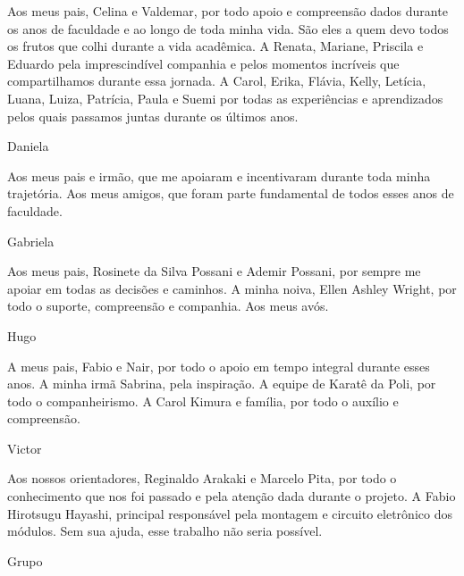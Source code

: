 Aos meus pais, Celina e Valdemar, por todo apoio e compreensão dados durante os anos de faculdade e ao longo de toda minha vida. São eles a quem devo todos os frutos que colhi durante a vida acadêmica.
A Renata, Mariane, Priscila e Eduardo pela imprescindível companhia e pelos momentos incríveis que compartilhamos durante essa jornada.
A Carol, Erika, Flávia, Kelly, Letícia, Luana, Luiza, Patrícia, Paula e Suemi por todas as experiências e aprendizados pelos quais passamos juntas durante os últimos anos.
\begin{flushright}
    Daniela
\end{flushright}

Aos meus pais e irmão, que me apoiaram e incentivaram durante toda minha trajetória. Aos meus amigos, que foram parte fundamental de todos esses anos de faculdade.
\begin{flushright}
    Gabriela
\end{flushright}

Aos meus pais, Rosinete da Silva Possani e Ademir Possani, por sempre me apoiar em todas as decisões e caminhos. A minha noiva, Ellen Ashley Wright, por todo o suporte, compreensão e companhia. Aos meus avós.
\begin{flushright}
    Hugo
\end{flushright}

A meus pais, Fabio e Nair, por todo o apoio em tempo integral durante esses anos.
A minha irmã Sabrina, pela inspiração.
A equipe de Karatê da Poli, por todo o companheirismo.
A Carol Kimura e família, por todo o auxílio e compreensão.
\begin{flushright}
    Victor
\end{flushright}

Aos nossos orientadores, Reginaldo Arakaki e Marcelo Pita, por todo o conhecimento que nos foi passado e pela atenção dada durante o projeto.
A Fabio Hirotsugu Hayashi, principal responsável pela montagem e circuito eletrônico dos módulos. Sem sua ajuda, esse trabalho não seria possível.
\begin{flushright}
    Grupo
\end{flushright}
